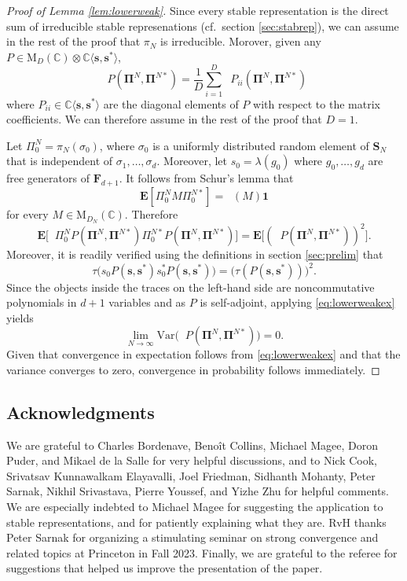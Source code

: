 \documentclass[10pt,reqno]{amsart}
\theoremstyle{definition}
\theoremstyle{remark}
\numberwithin{equation}{section}
\numberwithin{figure}{section}
\numberwithin{table}{section}
\newcommand{\ntrDDN}{\mathop{\mathrm{tr}_{DD_N}}}
\newcommand{\ntrDN}{\mathop{\mathrm{tr}_{D_N}}}
\newcommand{\id}{\mathbf{1}}
\begin{document}
\begin{proof}[Proof of Lemma \ref{lem:lowerweak}]
Since every stable representation is the direct sum 
of irreducible stable represenations (cf.\ section \ref{sec:stabrep}),
we can assume in the rest of the proof that 
$\pi_N$ is irreducible. Morover, given any 
$P\in \mathrm{M}_D(\mathbb{C})
\otimes \mathbb{C}\langle\boldsymbol{s},\boldsymbol{s}^*\rangle$,
$$
	\ntrDDN P(\boldsymbol{\Pi}^N,\boldsymbol{\Pi}^{N*}) =
	\frac{1}{D}
	\sum_{i=1}^D \ntrDN P_{ii}(\boldsymbol{\Pi}^N,\boldsymbol{\Pi}^{N*})
$$
where $P_{ii}\in \mathbb{C}\langle\boldsymbol{s},\boldsymbol{s}^*\rangle$ 
are the diagonal elements of $P$ with respect to the matrix coefficients. 
We can therefore assume in the rest of the proof that $D=1$.

Let $\Pi^N_0=\pi_N(\sigma_0)$, where
$\sigma_0$ is a uniformly distributed random element of $\mathbf{S}_N$
that is independent of $\sigma_1,\ldots,\sigma_d$.
Moreover, let $s_0=\lambda(g_0)$ where $g_0,\ldots,g_d$ are free 
generators of $\mathbf{F}_{d+1}$.
It follows from Schur's lemma that
$$
	\mathbf{E}[\Pi^N_0 M \Pi^{N*}_0] =
	\ntrDN(M) \id
$$
for every $M\in\mathrm{M}_{D_N}(\mathbb{C})$. Therefore
$$
	\mathbf{E}\big[\ntrDN \Pi^N_0
	P(\boldsymbol{\Pi}^N,\boldsymbol{\Pi}^{N*})
	\Pi^{N*}_0 P(\boldsymbol{\Pi}^N,\boldsymbol{\Pi}^{N*})\big] =
	\mathbf{E}\big[
	(\ntrDN P(\boldsymbol{\Pi}^N,\boldsymbol{\Pi}^{N*}))^2\big].
$$
Moreover, it is readily verified using the definitions in
section \ref{sec:prelim} that
$$
	\tau\big(s_0 P(\boldsymbol{s},\boldsymbol{s}^*) s^*_0
	P(\boldsymbol{s},\boldsymbol{s}^*)\big) =
	\big(\tau(P(\boldsymbol{s},\boldsymbol{s}^*))\big)^2.
$$
Since the objects inside the traces on the left-hand side are 
noncommutative polynomials in $d+1$ variables and as $P$ is self-adjoint, 
applying \eqref{eq:lowerweakex} yields
$$
	\lim_{N\to\infty}
	\mathrm{Var}\big(\ntrDN P(\boldsymbol{\Pi}^N,\boldsymbol{\Pi}^{N*})
	\big) 
	=0.
$$
Given that convergence in expectation follows from \eqref{eq:lowerweakex} 
and that the variance converges to zero, convergence in probability 
follows immediately.
\end{proof}


\subsection*{Acknowledgments}

\!\!We are grateful to Charles Bordenave, Beno{\^i}t Collins, Michael 
Magee, Doron Puder, and Mikael de la Salle for very helpful discussions, 
and to Nick Cook, Srivatsav Kunnawalkam Elayavalli, Joel Friedman, 
Sidhanth Mohanty, Peter Sarnak, Nikhil Srivastava, Pierre Youssef, and 
Yizhe Zhu for helpful comments. We are especially indebted to Michael 
Magee for suggesting the application to stable representations, and for 
patiently explaining what they are. RvH thanks Peter Sarnak for organizing 
a stimulating seminar on strong convergence and related topics at 
Princeton in Fall 2023. Finally, we are grateful to the referee for 
suggestions that helped us improve the presentation of the paper.
\end{document}
